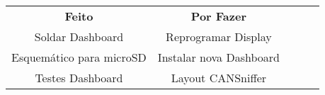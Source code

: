 \documentclass{article}
\begin{document}
\begin{table}[htpb]
\centering

\begin{tabular}{|c|c|lll}
\cline{1-2}
\cellcolor[HTML]{32CB00}\textbf{Feito} & \cellcolor[HTML]{FE0000}\textbf{Por Fazer} &  &  &  \\ \cline{1-2}
Soldar Dashboard                       & Reprogramar Display                        &  &  &  \\ \cline{1-2}
Esquemático para microSD               & Instalar nova Dashboard                    &  &  &  \\ \cline{1-2}
Testes Dashboard                       & Layout CANSniffer                          &  &  &  \\ \cline{1-2}
\end{tabular}
\end{table}
\end{document}
